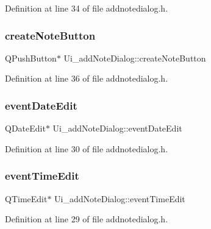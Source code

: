 Definition at line 34 of file addnotedialog.\+h.

\hypertarget{classUi__addNoteDialog_a095d7b7256d2a2449943e7c4f0afa209}{}\label{classUi__addNoteDialog_a095d7b7256d2a2449943e7c4f0afa209} 
\subsubsection{\texorpdfstring{create\+Note\+Button}{createNoteButton}}
{\footnotesize\ttfamily Q\+Push\+Button$\ast$ Ui\+\_\+add\+Note\+Dialog\+::create\+Note\+Button}



Definition at line 36 of file addnotedialog.\+h.

\hypertarget{classUi__addNoteDialog_adb9af8a9610aaea19686f07c381095a4}{}\label{classUi__addNoteDialog_adb9af8a9610aaea19686f07c381095a4} 
\subsubsection{\texorpdfstring{event\+Date\+Edit}{eventDateEdit}}
{\footnotesize\ttfamily Q\+Date\+Edit$\ast$ Ui\+\_\+add\+Note\+Dialog\+::event\+Date\+Edit}



Definition at line 30 of file addnotedialog.\+h.

\hypertarget{classUi__addNoteDialog_a6c1f24a74ed0a88961136db719c3ae4e}{}\label{classUi__addNoteDialog_a6c1f24a74ed0a88961136db719c3ae4e} 
\subsubsection{\texorpdfstring{event\+Time\+Edit}{eventTimeEdit}}
{\footnotesize\ttfamily Q\+Time\+Edit$\ast$ Ui\+\_\+add\+Note\+Dialog\+::event\+Time\+Edit}



Definition at line 29 of file addnotedialog.\+h.

